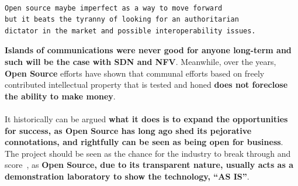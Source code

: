 \documentclass[a4paper, 12pt]{book}
\begin{document}
\begin{verbatim}

Open source maybe imperfect as a way to move forward
but it beats the tyranny of looking for an authoritarian
dictator in the market and possible interoperability issues.

\end{verbatim}
\textbf{Islands of communications were never good for anyone long-term and such will be the case with SDN and NFV}. Meanwhile, over the years, \textbf{Open Source} efforts have shown that communal efforts based on freely contributed intellectual property that is tested and honed \textbf{does not foreclose the ability to make money}.\\
\\
It historically can be argued \textbf{what it does is to expand the opportunities for success, as Open Source has long ago shed its pejorative connotations, and rightfully can be seen as being open for business}. The project should be seen as the chance for the industry to break through and score~\cite{NFVZoneOpenDaylight}, as \textbf{Open Source, due to its transparent nature, usually acts as a demonstration laboratory to show the technology, ``AS IS''}.
\end{document}
